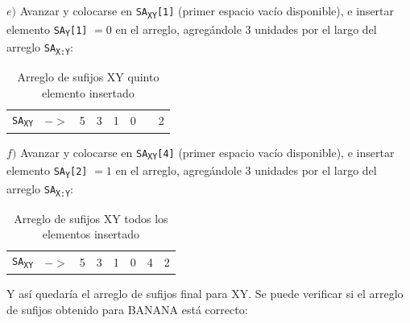 $e)$ Avanzar y colocarse en \texttt{SA\textsubscript{XY}[1]} (primer espacio vacío disponible), e insertar elemento \texttt{SA\textsubscript{Y}[1]} $= 0$ en el arreglo, agregándole 3 unidades por el largo del arreglo \texttt{SA\textsubscript{X:Y}}:

\begin{table}[!hbt]
\centering
\begin{tabular}{cc|c|c|c|c|c|c|}
\cline{3-8}
\texttt{SA\textsubscript{XY}} &  $->$ & 5 & 3 & 1 & 0 &  & 2 \\ \cline{3-8} 
\end{tabular}
\caption{Arreglo de sufijos XY quinto elemento insertado}
\end{table}

$f)$ Avanzar y colocarse en \texttt{SA\textsubscript{XY}[4]} (primer espacio vacío disponible), e insertar elemento \texttt{SA\textsubscript{Y}[2]} $= 1$ en el arreglo, agregándole 3 unidades por el largo del arreglo \texttt{SA\textsubscript{X:Y}}:

\newpage

\begin{table}[!hbt]
\centering
\begin{tabular}{cc|c|c|c|c|c|c|}
\cline{3-8}
\texttt{SA\textsubscript{XY}} &  $->$ & 5 & 3 & 1 & 0 & 4 & 2 \\ \cline{3-8} 
\end{tabular}
\caption{Arreglo de sufijos XY todos los elementos insertado}
\end{table}

Y así quedaría el arreglo de sufijos final para XY. Se puede verificar si el arreglo de sufijos obtenido para BANANA está correcto:

